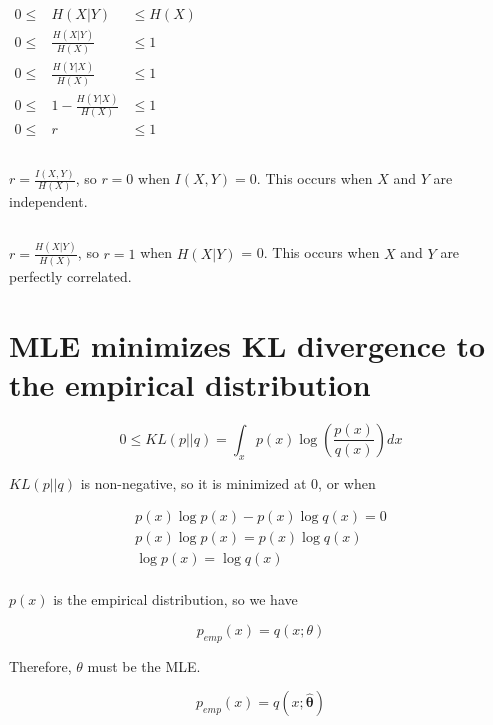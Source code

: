 \documentclass{article}
\begin{document}
\subsection{}
$
\begin{array}{rcl}
  0 \leq 
  & H(X|Y)
  & \leq H(X) \\
  0 \leq
  & \frac{H(X|Y)}{H(X)}
  & \leq 1 \\
  0 \leq 
  & \frac{H(Y|X)}{H(X)}
  & \leq 1 \\
  0 \leq
  & 1 - \frac{H(Y|X)}{H(X)}
  & \leq 1 \\
  0 \leq
  & r
  & \leq 1
\end{array}
$

\subsection{}
$r = \frac{I(X,Y)}{H(X)}$, so $r = 0$ when $I(X,Y) = 0$. This occurs
when $X$ and $Y$ are independent.

\subsection{}
$r = \frac{H(X|Y)}{H(X)}$, so $r = 1$ when $H(X|Y)$ = 0. This occurs
when $X$ and $Y$ are perfectly correlated.

\section{MLE minimizes KL divergence to the empirical distribution}

\[
0 \le KL(p || q) = \int_x p(x) \log \left( \frac{p(x)}{q(x)} \right)
dx
\]

$KL(p||q)$ is non-negative, so it is minimized at 0, or when

\begin{gather*}
  p(x) \log p(x) - p(x) \log q(x) = 0 \\
  p(x) \log p(x) = p(x) \log q(x) \\
  \log p(x) = \log q(x) \\
\end{gather*}

$p(x)$ is the empirical distribution, so we have

\begin{equation*}
  p_{emp}(x) =  q(x; \theta)
\end{equation*}

Therefore, $\theta$ must be the MLE.

\begin{equation*}
  p_{emp}(x) = q(x; \boldsymbol{\hat{\theta}})
\end{equation*}
\end{document}
